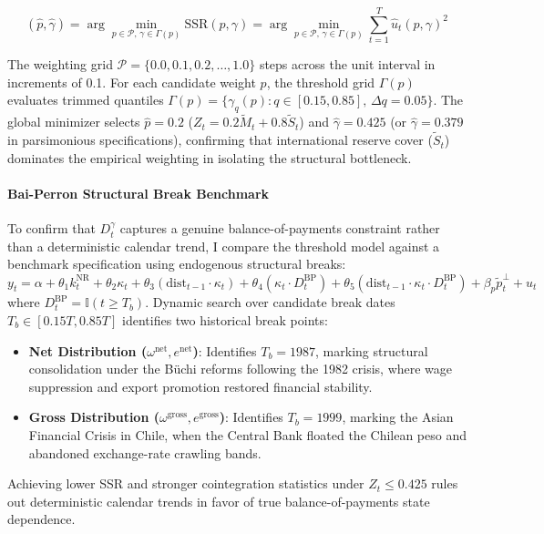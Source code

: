 \begin{equation}
	(\hat{p}, \hat{\gamma}) = \arg\min_{p \in \mathcal{P}, \, \gamma \in \Gamma(p)} \text{SSR}(p, \gamma) = \arg\min_{p \in \mathcal{P}, \, \gamma \in \Gamma(p)} \sum_{t=1}^{T} \hat{u}_t(p, \gamma)^2
\end{equation}

The weighting grid $\mathcal{P} = \{ 0.0, 0.1, 0.2, \dots, 1.0 \}$ steps across the unit interval in increments of 0.1. For each candidate weight $p$, the threshold grid $\Gamma(p)$ evaluates trimmed quantiles $\Gamma(p) = \{ \gamma_q(p) : q \in [0.15, 0.85], \, \Delta q = 0.05 \}$. The global minimizer selects $\hat{p} = 0.2$ ($Z_t = 0.2 \tilde{M}_t + 0.8 \tilde{S}_t$) and $\hat{\gamma} = 0.425$ (or $\hat{\gamma} = 0.379$ in parsimonious specifications), confirming that international reserve cover ($\tilde{S}_t$) dominates the empirical weighting in isolating the structural bottleneck.

\paragraph{Bai-Perron Structural Break Benchmark}
To confirm that $D_t^{\gamma}$ captures a genuine balance-of-payments constraint rather than a deterministic calendar trend, I compare the threshold model against a benchmark specification using \citet{BaiPerron2003} endogenous structural breaks:
\begin{equation}
	y_t = \alpha + \theta_1 k_t^{\text{NR}} + \theta_2 \kappa_t + \theta_3 (\text{dist}_{t-1} \cdot \kappa_t) + \theta_4 (\kappa_t \cdot D_t^{\text{BP}}) + \theta_5 (\text{dist}_{t-1} \cdot \kappa_t \cdot D_t^{\text{BP}}) + \beta_p \tilde{p}_t^\perp + u_t
\end{equation}
where $D_t^{\text{BP}} = \mathbb{I}(t \ge T_b)$. Dynamic search over candidate break dates $T_b \in [0.15 T, 0.85 T]$ identifies two historical break points:
\begin{itemize}
	\item \textbf{Net Distribution ($\omega^{\text{net}}, e^{\text{net}}$)}: Identifies $T_b = 1987$, marking structural consolidation under the Büchi reforms following the 1982 crisis, where wage suppression and export promotion restored financial stability.
	\item \textbf{Gross Distribution ($\omega^{\text{gross}}, e^{\text{gross}}$)}: Identifies $T_b = 1999$, marking the Asian Financial Crisis in Chile, when the Central Bank floated the Chilean peso and abandoned exchange-rate crawling bands.
\end{itemize}
Achieving lower SSR and stronger cointegration statistics under $Z_t \le 0.425$ rules out deterministic calendar trends in favor of true balance-of-payments state dependence.

